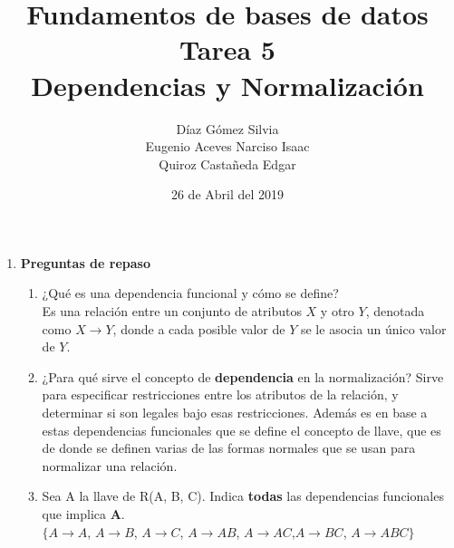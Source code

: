 \documentclass{article}
\begin{document}
    \title{
        Fundamentos de bases de datos \\
        Tarea 5 \\
        Dependencias y Normalización
    }
    \author{
        Díaz Gómez Silvia \\
        Eugenio Aceves Narciso Isaac \\
        Quiroz Castañeda Edgar
    }
    \date {
        26 de Abril del 2019    
    }
    \maketitle
    
    \begin{enumerate}
    	
    
    \item { \textbf{Preguntas de repaso}}
    \begin{enumerate}[label = \alph*.]
        \item ¿Qué es una dependencia funcional y cómo se define?\\
        Es una relación entre un conjunto de atributos $X$ y
        otro $Y$, denotada como $X \rightarrow Y$, donde a cada
        posible valor de $Y$ se le asocia un único valor de $Y$.
        \item ¿Para qué sirve el concepto de \textbf{dependencia} en la normalización?
        Sirve para especificar restricciones entre los atributos
        de la relación, y determinar si son legales bajo esas
        restricciones. Además es en base a estas dependencias
        funcionales que se define el concepto de llave, que es
        de donde se definen varias de las formas normales que se
        usan para normalizar una relación.
        \item Sea A la llave de R(A, B, C). Indica \textbf{todas} las dependencias funcionales que implica \textbf{A}. \\
        $\{A \rightarrow A$, $A \rightarrow B$, 
        $A \rightarrow C$, $A \rightarrow AB$,
        $A \rightarrow AC$,$A \rightarrow BC$, 
        $A \rightarrow ABC\}$\\
        

\end{enumerate}
\end{enumerate}
\end{document}
